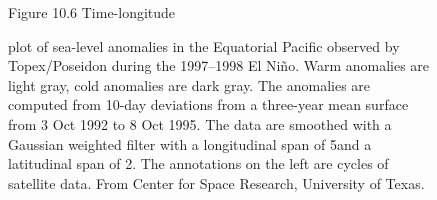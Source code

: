 \begin{figure}[t!]
\footnotesize
Figure 10.6 Time-longitude \rule{0pt}{3ex}plot of sea-level
anomalies in the Equatorial Pacific observed
by Topex/Poseidon during the 1997--1998 El
Ni\~{n}o. Warm
anomalies are light gray,
cold anomalies are dark gray. The anomalies are computed from 10-day
deviations from a three-year mean surface from 3 Oct 1992 to 8 Oct
1995. The data are smoothed with a Gaussian weighted filter with a
longitudinal span of 5\degrees and a latitudinal span of
2\degrees. The annotations on the left are cycles of satellite
data. From Center for Space Research, University of Texas.
\label{texas-may01}
\vspace{-3ex}
\end{figure}

